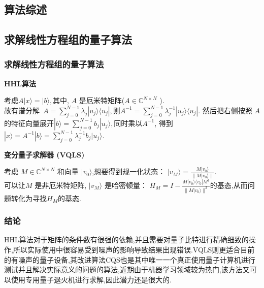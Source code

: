 \documentclass{beamer}
\begin{document}
\begin{spacing}{1.2}
{    \section{算法综述}
    \subsection{求解线性方程组的量子算法}
    \begin{frame}
    	\frametitle{求解线性方程组的量子算法}
    	\textbf{HHL算法}
    	
    	考虑$A|x\rangle = |b\rangle ,$其中, $A$ 是厄米特矩阵($A \in \mathbb{C}^{N \times N}$ ).\\
    	故有谱分解~$A=\sum_{j=0}^{N-1}\lambda_j|u_j\rangle\langle u_j|, $则$A^{-1}=\sum_{j=0}^{N-1}\lambda_j^{-1}|u_j\rangle\langle u_j|. $  
    	然后把右侧按照 $A$ 的特征向量展开$|b\rangle = \sum_{j=0}^{N-1}b_j|u_j\rangle, $同时乘以$A^{-1}$, 得到$|x\rangle = A^{-1}|b\rangle = \sum_{j=0}^{N-1}\lambda_j^{-1}b_j|u_j\rangle.$
    	\vspace{20pt}
    	
        \textbf{变分量子求解器 (VQLS)}
        
        考虑 $M \in \mathbb{C}^{N \times N}$ 和向量 $|v_0\rangle$,想要得到规一化状态：
           $|v_M\rangle = \frac{M |v_0\rangle}{\|M |v_0\rangle\|}.$\\
        可以让$M$ 是非厄米特矩阵, $|v_M\rangle$ 是哈密顿量：
        $ H_M = I - \frac{M|v_0\rangle \langle v_0| M^\dagger}{\|M |v_0\rangle\|^2} $的基态,从而问题转化为寻找$H_M$的基态.
    \end{frame}

    \begin{frame}
         \frametitle{结论}
         
         HHL算法对于矩阵的条件数有很强的依赖,并且需要对量子比特进行精确细致的操作,所以实际使用中很容易受到噪声的影响导致结果出现错误.VQLS则更适合目前的有噪声的量子设备,其改进算法CQS也是其中唯一一个真正使用量子计算机进行测试并且解决实际意义的问题的算法,近期由于机器学习领域较为热门,该方法又可以使用专用量子退火机进行求解,因此潜力还是很大的.
    \end{frame}

}
\end{spacing}
\end{document}
